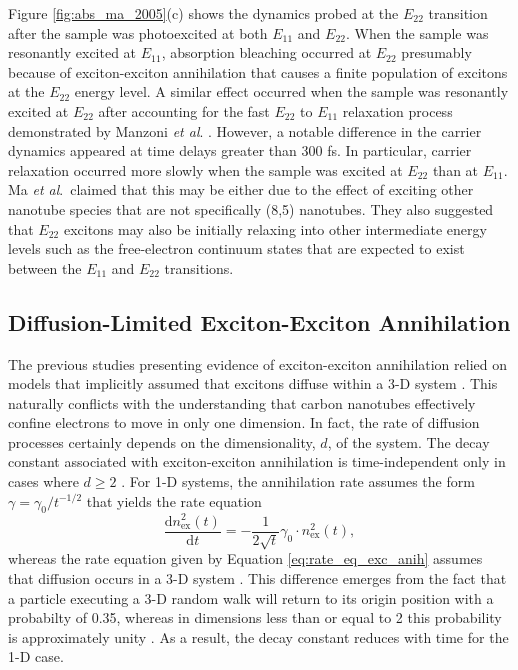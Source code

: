  Figure \ref{fig:abs_ma_2005}(c) shows the dynamics probed at the $E_{22}$ transition after the sample was photoexcited at both $E_{11}$ and $E_{22}$. When the sample was resonantly excited at $E_{11}$, absorption bleaching occurred at $E_{22}$ presumably because of exciton-exciton annihilation that causes a finite population of excitons at the $E_{22}$ energy level. A similar effect occurred when the sample was resonantly excited at $E_{22}$ after accounting for the fast $E_{22}$ to $E_{11}$ relaxation process demonstrated by Manzoni \textit{et al}. \cite{manzoni2005intersubband}. However, a notable difference in the carrier dynamics appeared at time delays greater than 300 fs. In particular, carrier relaxation occurred more slowly when the sample was excited at $E_{22}$ than at $E_{11}$. Ma \textit{et al}.\ claimed that this may be either due to the effect of exciting other nanotube species that are not specifically (8,5) nanotubes. They also suggested that $E_{22}$ excitons may also be initially relaxing into other intermediate energy levels such as the free-electron continuum states that are expected to exist between the $E_{11}$ and $E_{22}$ transitions.



\subsection{Diffusion-Limited Exciton-Exciton Annihilation}
The previous studies presenting evidence of exciton-exciton annihilation relied on models that implicitly assumed that excitons diffuse within a 3-D system \cite{wang2004observation,ma2004ultrafast, ma2005femtosecond}. This naturally conflicts with the understanding that carbon nanotubes effectively confine electrons to move in only one dimension. In fact, the rate of diffusion processes certainly depends on the dimensionality, $d$, of the system. The decay constant associated with exciton-exciton annihilation is time-independent only in cases where $d \geq 2$ \cite{valkunas2006exciton}. For 1-D systems, the annihilation rate assumes the form $\gamma = \gamma_0 / t^{-1/2}$ that yields the rate equation
\begin{equation}
		\frac{\mathrm{d} n_\text{ex}^2(t)}{\mathrm{d}t} = -\frac{1}{2 \sqrt{t}}  \gamma_0 \cdot n_\text{ex}^2(t),
		\label{eq:exc_1d_annih}
\end{equation}
whereas the rate equation given by Equation \eqref{eq:rate_eq_exc_anih} assumes that diffusion occurs in a 3-D system \cite{suna1970kinematics}. This difference emerges from the fact that a particle executing a 3-D random walk will return to its origin position with a probabilty of 0.35, whereas in dimensions less than or equal to 2 this probability is approximately unity \cite{suna1970kinematics}. As a result, the decay constant reduces with time for the 1-D case.


